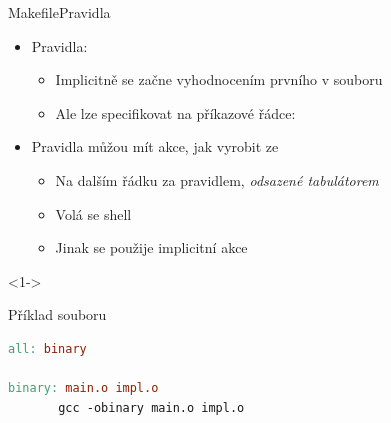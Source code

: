\begin{frame}[fragile]{Makefile}{Pravidla}

  \begin{itemize}
    \item Pravidla: 
    \begin{itemize}
      \item Implicitně se začne vyhodnocením prvního v souboru

      \pause

      \item Ale lze specifikovat na příkazové řádce: 
    \end{itemize}

    \pause

    \item Pravidla můžou mít akce, jak  vyrobit ze
    \begin{itemize}
      \item Na dalším řádku za pravidlem, \emph{odsazené tabulátorem}

      \pause

      \item Volá se shell

      \pause

      \item Jinak se použije implicitní akce
    \end{itemize}
  \end{itemize}

  \begin{onslide}<1->
    \begin{block}{Příklad souboru }
      \begin{lstlisting}[language=make,columns=fullflexible]
all: binary

binary: main.o impl.o
       gcc -obinary main.o impl.o
      \end{lstlisting}
    \end{block}
  \end{onslide}

\end{frame}

